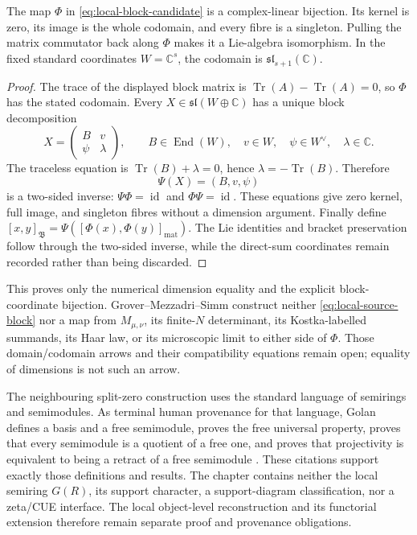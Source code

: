 \begin{proposition}
\label{prop:local-block-coordinate-bijection}
The map $\Phi$ in \eqref{eq:local-block-candidate} is a complex-linear bijection.  Its kernel
is zero, its image is the whole codomain, and every fibre is a singleton.  Pulling the matrix
commutator back along $\Phi$ makes it a Lie-algebra isomorphism.  In the fixed standard
coordinates $W=\mathbb C^s$, the codomain is $\mathfrak{sl}_{s+1}(\mathbb C)$.
\end{proposition}
\begin{proof}
The trace of the displayed block matrix is
$\operatorname{Tr}(A)-\operatorname{Tr}(A)=0$, so $\Phi$ has the stated codomain.  Every
$X\in\mathfrak{sl}(W\oplus\mathbb C)$ has a unique block decomposition
\[
 X=\begin{pmatrix}B&v\\ \psi&\lambda\end{pmatrix},
 \qquad
 B\in\operatorname{End}(W),\quad v\in W,\quad\psi\in W^\vee,\quad\lambda\in\mathbb C.
\]
The traceless equation is $\operatorname{Tr}(B)+\lambda=0$, hence
$\lambda=-\operatorname{Tr}(B)$.  Therefore
\begin{equation}
 \Psi(X)=(B,v,\psi)
 \label{eq:local-block-inverse}
\end{equation}
is a two-sided inverse: $\Psi\Phi=\operatorname{id}$ and
$\Phi\Psi=\operatorname{id}$.  These equations give zero kernel, full image, and singleton
fibres without a dimension argument.  Finally define
$[x,y]_{\mathfrak B}=\Psi([\Phi(x),\Phi(y)]_{\mathrm{mat}})$.  The Lie identities and
bracket preservation follow through the two-sided inverse, while the direct-sum coordinates
remain recorded rather than being discarded.
\end{proof}

This proves only the numerical dimension equality and the explicit block-coordinate
bijection.  Grover--Mezzadri--Simm construct neither \eqref{eq:local-source-block} nor a map
from $M_{\mu,\nu}$, its finite-$N$ determinant, its Kostka-labelled summands, its Haar law, or
its microscopic limit to either side of $\Phi$.  Those domain/codomain arrows and their
compatibility equations remain open; equality of dimensions is not such an arrow.

The neighbouring split-zero construction uses the standard language of semirings and
semimodules.  As terminal human provenance for that language, Golan defines a basis and a
free semimodule, proves the free universal property, proves that every semimodule is a
quotient of a free one, and proves that projectivity is equivalent to being a retract of a
free semimodule \cite[Chap.~17, pp.~191--196, Props.~17.11, 17.12, 17.14, and
17.16]{golan1999}.  These citations support exactly those definitions and results.  The
chapter contains neither the local semiring $G(R)$, its support character, a support-diagram
classification, nor a zeta/CUE interface.  The local object-level reconstruction and its
functorial extension therefore remain separate proof and provenance obligations.

